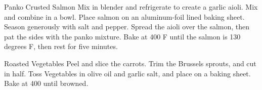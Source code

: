 \documentclass[]{article}
\title{}
\author{}
\begin{document}
\begin{recipe}{Panko Crusted Salmon}{}{}
	Mix in blender and refrigerate to create a garlic aioli.
	Mix and combine in a bowl. 
	Place salmon on an aluminum-foil lined baking sheet. Season generously with salt and pepper. Spread the aioli over the salmon, then pat the sides with the panko mixture. Bake at 400 F until the salmon is 130 degrees F, then rest for five minutes. 
\end{recipe}

\begin{recipe}{Roasted Vegetables}{}{}
	Peel and slice the carrots.
	Trim the Brussels sprouts, and cut in half. Toss Vegetables in olive oil and garlic salt, and place on a baking sheet.
	\ingredient[]{}{}
	Bake at 400 until browned. 
\end{recipe}
\end{document}
